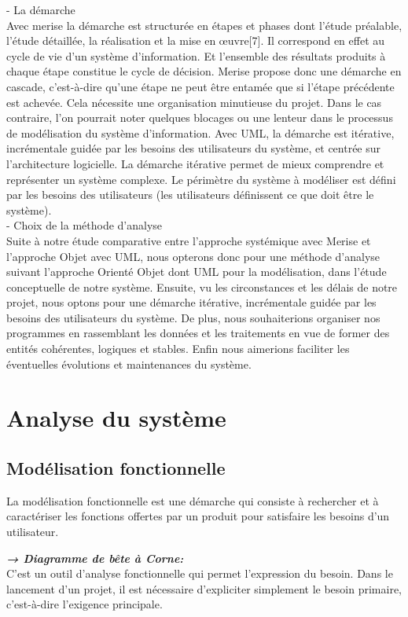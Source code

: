 	- La démarche \\
	Avec merise la démarche est structurée en étapes et phases dont l’étude préalable, l’étude détaillée, la réalisation et la mise en œuvre[7]. Il correspond en effet au cycle de vie d’un système d’information. Et l’ensemble des résultats produits à chaque étape constitue le cycle de décision. Merise propose donc une démarche en cascade, c’est-à-dire qu’une étape ne peut être entamée que si l’étape précédente est achevée. Cela nécessite une organisation minutieuse du projet. Dans le cas contraire, l'on pourrait noter quelques blocages ou une lenteur dans le processus de modélisation du système d’information. Avec UML, la démarche est itérative, incrémentale guidée par les besoins des utilisateurs du système, et centrée sur l’architecture logicielle. La démarche itérative permet de mieux comprendre et représenter un système complexe. Le périmètre du système à modéliser est défini par les besoins des utilisateurs (les utilisateurs définissent ce que doit être le système). \\

	- Choix de la méthode d’analyse \\
	Suite à notre étude comparative entre l’approche systémique avec Merise et l’approche Objet avec UML, nous opterons donc pour une méthode d’analyse suivant l’approche Orienté Objet dont UML pour la modélisation, dans l’étude conceptuelle de notre système. Ensuite, vu les circonstances et les délais de notre projet, nous optons pour une démarche itérative, incrémentale guidée par les besoins des utilisateurs du système. De plus, nous souhaiterions organiser nos programmes en rassemblant les données et les traitements en vue de former des entités cohérentes, logiques et stables. Enfin nous aimerions faciliter les éventuelles évolutions et maintenances du système. 
	
	
\section{Analyse du système}

\subsection{Modélisation fonctionnelle }
	La modélisation fonctionnelle est une démarche qui consiste à rechercher et à caractériser les fonctions offertes par un produit pour satisfaire les besoins d’un utilisateur.

\textbf{\textit{→ Diagramme de bête à Corne: }}\\
	C’est un outil d’analyse fonctionnelle  qui permet l’expression du besoin. Dans le lancement d’un projet, il est nécessaire d’expliciter simplement le besoin primaire, c’est-à-dire l’exigence principale. \\
	
